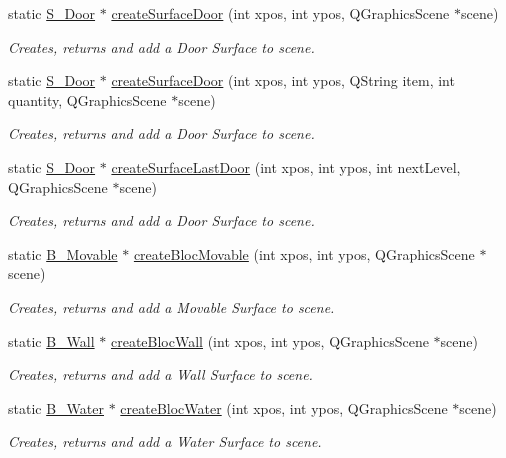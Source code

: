 \begin{DoxyCompactItemize}
static \hyperlink{class_s___door}{S\+\_\+\+Door} $\ast$ \hyperlink{class_factory___surface_a8f31a202ed9fae218b3f517c08f43723}{create\+Surface\+Door} (int xpos, int ypos, Q\+Graphics\+Scene $\ast$scene)
\begin{DoxyCompactList}\small\item\em Creates, returns and add a Door Surface to scene. \end{DoxyCompactList}\item 
static \hyperlink{class_s___door}{S\+\_\+\+Door} $\ast$ \hyperlink{class_factory___surface_abb875c8764cc75b19569160d84639309}{create\+Surface\+Door} (int xpos, int ypos, Q\+String item, int quantity, Q\+Graphics\+Scene $\ast$scene)
\begin{DoxyCompactList}\small\item\em Creates, returns and add a Door Surface to scene. \end{DoxyCompactList}\item 
static \hyperlink{class_s___door}{S\+\_\+\+Door} $\ast$ \hyperlink{class_factory___surface_afcbdd2fb2e1ecc891d29780efb5f65cd}{create\+Surface\+Last\+Door} (int xpos, int ypos, int next\+Level, Q\+Graphics\+Scene $\ast$scene)
\begin{DoxyCompactList}\small\item\em Creates, returns and add a Door Surface to scene. \end{DoxyCompactList}\item 
static \hyperlink{class_b___movable}{B\+\_\+\+Movable} $\ast$ \hyperlink{class_factory___surface_a80cc5865331117916b66f66336cc6233}{create\+Bloc\+Movable} (int xpos, int ypos, Q\+Graphics\+Scene $\ast$scene)
\begin{DoxyCompactList}\small\item\em Creates, returns and add a Movable Surface to scene. \end{DoxyCompactList}\item 
static \hyperlink{class_b___wall}{B\+\_\+\+Wall} $\ast$ \hyperlink{class_factory___surface_a80646d364778824260f5a8abc075801b}{create\+Bloc\+Wall} (int xpos, int ypos, Q\+Graphics\+Scene $\ast$scene)
\begin{DoxyCompactList}\small\item\em Creates, returns and add a Wall Surface to scene. \end{DoxyCompactList}\item 
static \hyperlink{class_b___water}{B\+\_\+\+Water} $\ast$ \hyperlink{class_factory___surface_a03d1d937a82ce191f4699d1eb2635425}{create\+Bloc\+Water} (int xpos, int ypos, Q\+Graphics\+Scene $\ast$scene)
\begin{DoxyCompactList}\small\item\em Creates, returns and add a Water Surface to scene. \end{DoxyCompactList}\end{DoxyCompactItemize}
